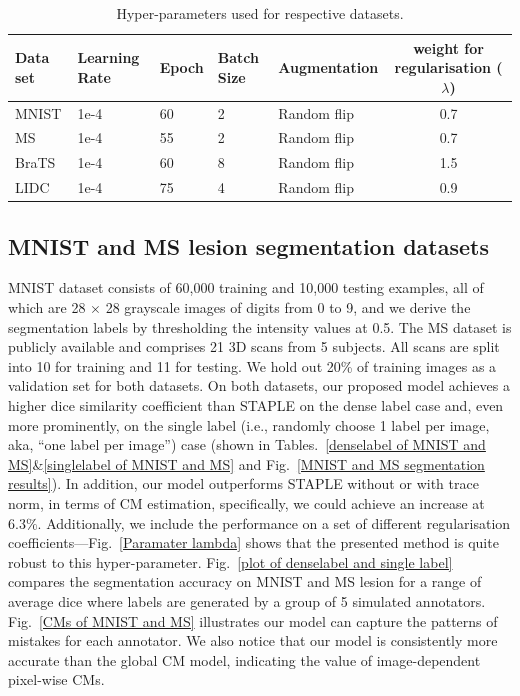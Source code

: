 \begin{table}[!h]
	\center
	\footnotesize
	\begin{tabular}{@{}lllllc}
		\hline
		 Data set & Learning Rate & Epoch & Batch Size & Augmentation & weight for regularisation ($\lambda$) \\
		\hline	
		MNIST  & 1e-4  & 60 & 2 & Random flip & 0.7 \\
		MS & 1e-4 & 55  & 2 & Random flip & 0.7\\
		BraTS & 1e-4 & 60 & 8 & Random flip & 1.5 \\
		LIDC & 1e-4  & 75 & 4 & Random flip & 0.9 \\
		\hline
	\end{tabular}%
\caption{\footnotesize Hyper-parameters used for respective datasets.}
\label{Experiments_settings}
\end{table}


\subsection{MNIST and MS lesion segmentation datasets}
MNIST dataset consists of 60,000 training and 10,000 testing examples, all of which are 28 $\times$ 28 grayscale images of digits from 0 to 9, and we derive the segmentation labels by thresholding the intensity values at 0.5. The MS dataset is publicly available and comprises 21 3D scans from 5 subjects. All scans are split into 10 for training and 11 for testing. We hold out 20\% of training images as a validation set for both datasets. On both datasets, our proposed model achieves a higher dice similarity coefficient than STAPLE on the dense label case and, even more prominently, on the single label (i.e., randomly choose 1 label per image, aka, ``one label per image'') case (shown in Tables.~\ref{denselabel of MNIST and MS}\&\ref{singlelabel of MNIST and MS} and Fig.~\ref{MNIST and MS segmentation results}). In addition, our model outperforms STAPLE without or with trace norm, in terms of CM estimation, specifically, we could achieve an increase at $6.3\%$. Additionally, we include the performance on a set of different regularisation coefficients---Fig.~\ref{Paramater lambda} shows that the presented method is quite robust to this hyper-parameter. Fig.~\ref{plot of denselabel and single label} compares the segmentation accuracy on MNIST and MS lesion for a range of average dice where labels are generated by a group of 5 simulated annotators. Fig.~\ref{CMs of MNIST and MS} illustrates our model can capture the patterns of mistakes for each annotator. We also notice that our model is consistently more accurate than the global CM model, indicating the value of image-dependent pixel-wise CMs. 


